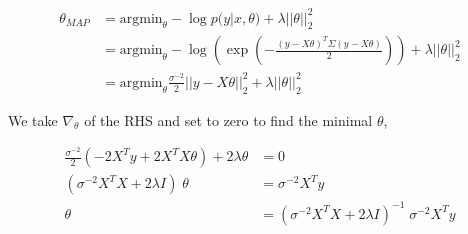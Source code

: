 %
%
\begin{answer}
\begin{align*}
\theta_{MAP} &= \text{argmin}_\theta - \log p(y | x, \theta) + \lambda ||\theta||_2^2
\\
&= \text{argmin}_\theta - \log \left( \exp(-\frac{(y - X \theta)^T \Sigma (y - X \theta)}{2}) \right ) + \lambda ||\theta||_2^2
\\
&= \text{argmin}_\theta \frac{\sigma^{-2}}{2} ||y - X \theta||_2^2 + \lambda ||\theta||_2^2
\end{align*}

We take $\nabla_\theta$ of the RHS and set to zero to find the minimal $\theta$,

\begin{align*}
\frac{\sigma^{-2}}{2} (-2 X^T y + 2 X^T X \theta) + 2 \lambda \theta &= 0
\\
(\sigma^{-2} X^T X + 2 \lambda I)\; \theta &=  \sigma^{-2} X^T y
\\
\theta &= (\sigma^{-2} X^T X + 2 \lambda I)^{-1}\; \sigma^{-2} X^T y
\end{align*}
\end{answer}
%

